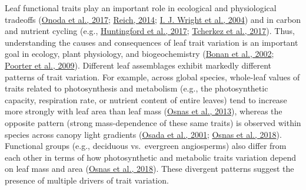 \documentclass[
  12pt,
  letterpaper,
  DIV=11,
  numbers=noendperiod]{scrartcl}
\begin{document}
Leaf functional traits play an important role in ecological and
physiological tradeoffs (\protect\hyperlink{ref-Onoda2017}{Onoda et al.,
2017}; \protect\hyperlink{ref-Reich2014}{Reich, 2014};
\protect\hyperlink{ref-Wright2004a}{I. J. Wright et al., 2004}) and in
carbon and nutrient cycling (e.g.,
\protect\hyperlink{ref-Huntingford2017}{Huntingford et al., 2017};
\protect\hyperlink{ref-Tcherkez2017}{Tcherkez et al., 2017}). Thus,
understanding the causes and consequences of leaf trait variation is an
important goal in ecology, plant physiology, and biogeochemistry
(\protect\hyperlink{ref-Bonan2002}{Bonan et al., 2002};
\protect\hyperlink{ref-Poorter2009}{Poorter et al., 2009}). Different
leaf assemblages exhibit markedly different patterns of trait variation.
For example, across global species, whole-leaf values of traits related
to photosynthesis and metabolism (e.g., the photosynthetic capacity,
respiration rate, or nutrient content of entire leaves) tend to increase
more strongly with leaf area than leaf mass
(\protect\hyperlink{ref-Osnas2013}{Osnas et al., 2013}), whereas the
opposite pattern (strong mass-dependence of these same traits) is
observed within species across canopy light gradients
(\protect\hyperlink{ref-Osada2001}{Osada et al., 2001};
\protect\hyperlink{ref-Osnas2018}{Osnas et al., 2018}). Functional
groups (e.g., deciduous vs.~evergreen angiosperms) also differ from each
other in terms of how photosynthetic and metabolic traits variation
depend on leaf mass and area (\protect\hyperlink{ref-Osnas2018}{Osnas et
al., 2018}). These divergent patterns suggest the presence of multiple
drivers of trait variation.
\end{document}
